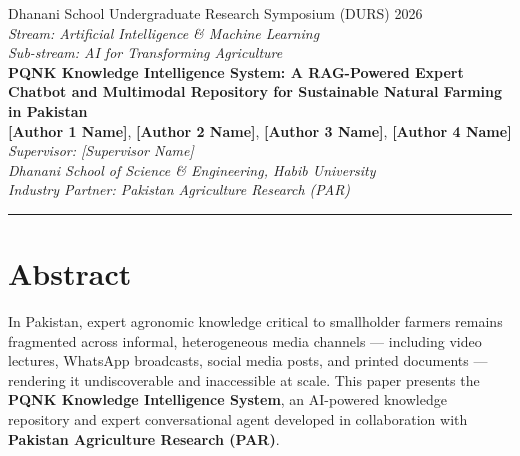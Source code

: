\documentclass[12pt, a4paper]{article}
\begin{document}
\begin{onehalfspacing}

\begin{center}
  {\small Dhanani School Undergraduate Research Symposium (DURS) 2026}\\[4pt]
  {\small \textit{Stream: Artificial Intelligence \& Machine Learning}}\\[4pt]
  {\small \textit{Sub-stream: AI for Transforming Agriculture}}\\[18pt]

  {\LARGE \bfseries PQNK Knowledge Intelligence System: A RAG-Powered Expert\\[4pt]
  Chatbot and Multimodal Repository for Sustainable Natural Farming in Pakistan}\\[14pt]

  {\normalsize
    \textbf{[Author 1 Name]}, \textbf{[Author 2 Name]},
    \textbf{[Author 3 Name]}, \textbf{[Author 4 Name]}\\[4pt]
    \textit{Supervisor: [Supervisor Name]}\\[4pt]
    \textit{Dhanani School of Science \& Engineering, Habib University}\\[4pt]
    \textit{Industry Partner: Pakistan Agriculture Research (PAR)}\\[4pt]
  }
\end{center}

\vspace{6pt}\hrule\vspace{14pt}

\section*{Abstract}
In Pakistan, expert agronomic knowledge critical to smallholder farmers remains
fragmented across informal, heterogeneous media channels --- including video lectures,
WhatsApp broadcasts, social media posts, and printed documents --- rendering it
undiscoverable and inaccessible at scale. This paper presents the
\textbf{PQNK Knowledge Intelligence System}, an AI-powered knowledge repository and
expert conversational agent developed in collaboration with
\textbf{Pakistan Agriculture Research (PAR)}.


\end{onehalfspacing}
\end{document}
